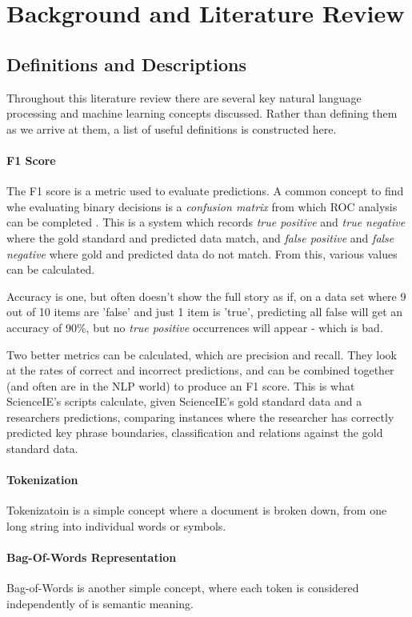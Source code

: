 \chapter{Background and Literature Review}

\section{Definitions and Descriptions}
Throughout this literature review there are several key natural language processing and machine learning concepts discussed. Rather than defining them as we arrive at them, a list of useful definitions is constructed here.

\subsubsection*{F1 Score}
The F1 score is a metric used to evaluate predictions. A common concept to find whe evaluating binary decisions is a \textit{confusion matrix} from which ROC analysis can be completed \cite{Fawcett2006}. This is a system which records \textit{true positive} and \textit{true negative} where the gold standard and predicted data match, and \textit{false positive} and \textit{false negative} where gold and predicted data do not match. From this, various values can be calculated. 

Accuracy is one, but often doesn't show the full story as if, on a data set where 9 out of 10 items are 'false' and just 1 item is 'true', predicting all false will get an accuracy of 90\%, but no \textit{true positive} occurrences will appear - which is bad. 

Two better metrics can be calculated, which are precision and recall. They look at the rates of correct and incorrect predictions, and can be combined together (and often are in the NLP world) to produce an F1 score. This is what ScienceIE's scripts calculate, given ScienceIE's gold standard data and a researchers predictions, comparing instances where the researcher has correctly predicted key phrase boundaries, classification and relations against the gold standard data.

\subsubsection*{Tokenization}
Tokenizatoin is a simple concept where a document is broken down, from one long string into individual words or symbols. 

\subsubsection*{Bag-Of-Words Representation}
Bag-of-Words is another simple concept, where each token is considered independently of is semantic meaning. 

